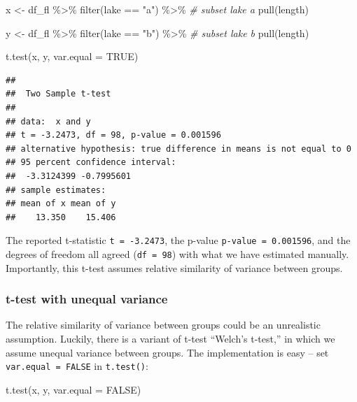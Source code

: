 \documentclass[
]{article}
\newenvironment{Shaded}{\begin{snugshade}}{\end{snugshade}}
\newcommand{\AttributeTok}[1]{\textcolor[rgb]{0.77,0.63,0.00}{#1}}
\newcommand{\CommentTok}[1]{\textcolor[rgb]{0.56,0.35,0.01}{\textit{#1}}}
\newcommand{\ConstantTok}[1]{\textcolor[rgb]{0.00,0.00,0.00}{#1}}
\newcommand{\FunctionTok}[1]{\textcolor[rgb]{0.00,0.00,0.00}{#1}}
\newcommand{\NormalTok}[1]{#1}
\newcommand{\OtherTok}[1]{\textcolor[rgb]{0.56,0.35,0.01}{#1}}
\newcommand{\SpecialCharTok}[1]{\textcolor[rgb]{0.00,0.00,0.00}{#1}}
\newcommand{\StringTok}[1]{\textcolor[rgb]{0.31,0.60,0.02}{#1}}
\begin{document}
\begin{Shaded}
\begin{Highlighting}[]
\NormalTok{x }\OtherTok{\textless{}{-}}\NormalTok{ df\_fl }\SpecialCharTok{\%\textgreater{}\%}
  \FunctionTok{filter}\NormalTok{(lake }\SpecialCharTok{==} \StringTok{"a"}\NormalTok{) }\SpecialCharTok{\%\textgreater{}\%}  \CommentTok{\# subset lake a}
  \FunctionTok{pull}\NormalTok{(length)}

\NormalTok{y }\OtherTok{\textless{}{-}}\NormalTok{ df\_fl }\SpecialCharTok{\%\textgreater{}\%}
  \FunctionTok{filter}\NormalTok{(lake }\SpecialCharTok{==} \StringTok{"b"}\NormalTok{) }\SpecialCharTok{\%\textgreater{}\%} \CommentTok{\# subset lake b}
  \FunctionTok{pull}\NormalTok{(length)}

\FunctionTok{t.test}\NormalTok{(x, y, }\AttributeTok{var.equal =} \ConstantTok{TRUE}\NormalTok{)}
\end{Highlighting}
\end{Shaded}

\begin{verbatim}
## 
##  Two Sample t-test
## 
## data:  x and y
## t = -3.2473, df = 98, p-value = 0.001596
## alternative hypothesis: true difference in means is not equal to 0
## 95 percent confidence interval:
##  -3.3124399 -0.7995601
## sample estimates:
## mean of x mean of y 
##    13.350    15.406
\end{verbatim}

The reported t-statistic \texttt{t\ =\ -3.2473}, the p-value \texttt{p-value\ =\ 0.001596}, and the degrees of freedom all agreed (\texttt{df\ =\ 98}) with what we have estimated manually. Importantly, this t-test assumes relative similarity of variance between groups.

\hypertarget{t-test-with-unequal-variance}{%
\subsubsection{t-test with unequal variance}\label{t-test-with-unequal-variance}}

The relative similarity of variance between groups could be an unrealistic assumption. Luckily, there is a variant of t-test ``Welch's t-test,'' in which we assume unequal variance between groups. The implementation is easy -- set \texttt{var.equal\ =\ FALSE} in \texttt{t.test()}:

\begin{Shaded}
\begin{Highlighting}[]
\FunctionTok{t.test}\NormalTok{(x, y, }\AttributeTok{var.equal =} \ConstantTok{FALSE}\NormalTok{)}
\end{Highlighting}
\end{Shaded}
\end{document}
